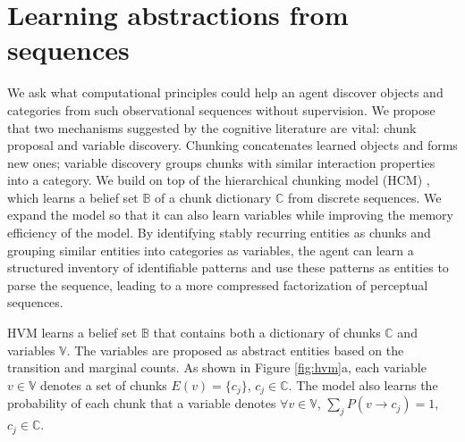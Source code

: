\documentclass{article} %
\theoremstyle{remark}
\newcommand{\peter}[1]{\textcolor{purple}{Peter: #1}}
\begin{document}
\section{Learning abstractions from sequences}


 
We ask what computational principles could help an agent discover objects and categories from such observational sequences without supervision. We propose that two mechanisms suggested by the cognitive literature are vital: chunk proposal and variable discovery. Chunking concatenates learned objects and forms new ones; variable discovery groups chunks with similar interaction properties into a category. We build on top of the hierarchical chunking model (HCM) \citep{wu_learning_2022}, which learns a belief set $\mathbb{B}$ of a chunk dictionary $\mathbb{C}$ from discrete sequences. We expand the model so that it can also learn variables while improving the memory efficiency of the model. 
By identifying stably recurring entities as chunks and grouping similar entities into categories as variables, the agent can learn a structured inventory of identifiable patterns and use these patterns as entities to parse the sequence, leading to a more compressed factorization of perceptual sequences. 

HVM learns a belief set $\mathbb{B}$ that contains both a dictionary of chunks $\mathbb{C}$ and variables $\mathbb{V}$. The variables are proposed as abstract entities based on the transition and marginal counts. As shown in Figure \ref{fig:hvm}a, each variable $v \in \mathbb{V}$ denotes a set of chunks $E(v) = \{c_j\}$, $c_j \in \mathbb{C}$. The model also learns the probability of each chunk that a variable denotes $\forall v \in \mathbb{V}$, $\sum_j P(v \rightarrow c_j) = 1$, $c_j \in \mathbb{C}$.
\end{document}
